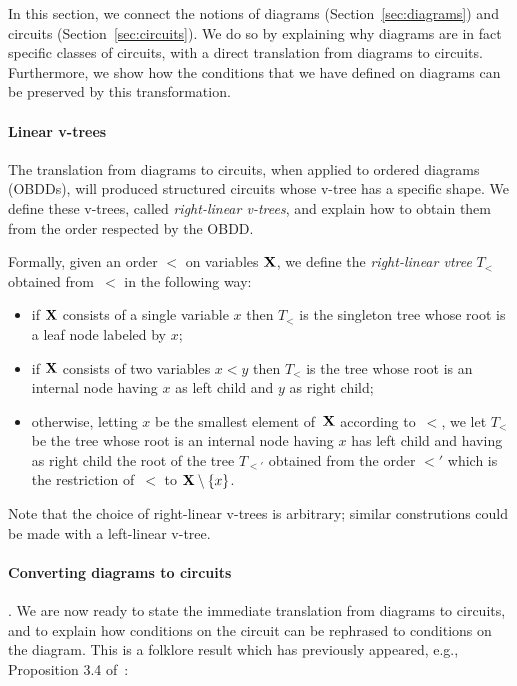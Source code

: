 
In this section, we connect the notions of diagrams
(Section~\ref{sec:diagrams}) and circuits (Section~\ref{sec:circuits}). We do
so by explaining why diagrams are in fact specific classes of circuits, with a
direct translation from diagrams to circuits.
Furthermore, we show how the conditions that we have defined on diagrams can be
preserved by this transformation.

\paragraph*{Linear v-trees}
The translation from diagrams to circuits, when applied to ordered diagrams
(OBDDs), will produced structured circuits whose v-tree has a specific shape.
We define these v-trees, called \emph{right-linear v-trees}, and explain how
to obtain them from the order respected by the OBDD.

Formally, given an order $<$ on variables $\mathbf{X}$, we define the
\emph{right-linear vtree} $T_<$ obtained from~$<$ in the following way:
\begin{itemize}
  \item if
$\mathbf{X}$ consists of a single variable $x$ then $T_<$ is the singleton tree whose root
is a leaf node labeled by $x$;
\item if $\mathbf{X}$ consists of two variables $x<y$ then $T_<$ is the tree whose
  root is an internal node having $x$ as left child and $y$ as right child;
\item otherwise, letting $x$ be the smallest element of~$\mathbf{X}$ according to~$<$,
  we let $T_<$ be the tree whose root is an internal node having $x$ has
    left child and having as right child the root of the tree $T_{<'}$ obtained
    from the order $<'$ which is the restriction of~$<$ to $\mathbf{X} \setminus \{x\}$.
\end{itemize}

Note that the choice of right-linear v-trees is arbitrary; similar
construtions could be made with a left-linear v-tree.

\paragraph*{Converting diagrams to circuits}. 
We are now ready to state the immediate translation from diagrams to
circuits, and to explain how conditions on the circuit can be rephrased to
conditions on the diagram. This is a folklore result which has previously
appeared, e.g., Proposition 3.4 of~\cite{ACMS20}:

